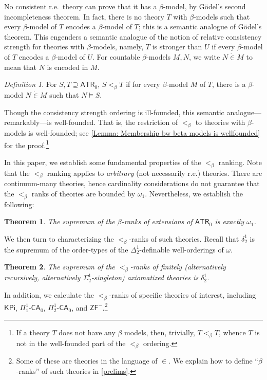 \documentclass{amsart}
\newtheorem{theorem}{Theorem}[section]
\theoremstyle{remark}
\newtheorem{definition}[definition]{Definition}
\begin{document}
No consistent r.e.\ theory can prove that it has a $\beta$-model, by G\"odel's second incompleteness theorem. In fact, there is no theory $T$ with $\beta$-models such that every $\beta$-model of $T$ encodes a $\beta$-model of $T$; this is a semantic analogue of G\"odel's theorem. This engenders a semantic analogue of the notion of relative consistency strength for theories with $\beta$-models, namely, $T$ is stronger than $U$ if every $\beta$-model of $T$ encodes a $\beta$-model of $U$. For countable $\beta$-models $M,N$, we write $N\dot\in M$ to mean that $N$ is encoded in $M$.

\begin{definition}
    For $S,T\supseteq \mathsf{ATR}_0$, $S<_\beta T$ if for every $\beta$-model $M$ of $T$, there is a $\beta$-model $N\dot\in M$ such that $N\vDash S$.
\end{definition}

Though the consistency strength ordering is ill-founded, this semantic analogue---remarkably---is well-founded. That is, the restriction of $<_\beta$ to theories with $\beta$-models is well-founded; see \autoref{Lemma: Membership bw beta models is wellfounded} for the proof.\footnote{If a theory $T$ does not have any $\beta$ models, then, trivially, $T<_\beta T$, whence $T$ is not in the well-founded part of the $<_\beta$ ordering.}

In this paper, we establish some fundamental properties of the $<_\beta$ ranking. Note that the $<_\beta$ ranking applies to \emph{arbitrary} (not necessarily r.e.) theories. There are continuum-many theories, hence cardinality considerations do not guarantee that the $<_\beta$ ranks of theories are bounded by $\omega_1$. Nevertheless, we establish the following:
\begin{theorem}
    The supremum of the $\beta$-ranks of extensions of $\mathsf{ATR}_0$ is exactly $\omega_1$.
\end{theorem}

We then turn to characterizing the $<_\beta$-ranks of such theories. Recall that $\delta^1_2$ is the supremum of the order-types of the $\Delta^1_2$-definable well-orderings of $\omega$.
\begin{theorem}
    The supremum of the $<_\beta$-ranks of finitely (alternatively recursively, alternatively $\Sigma^1_2$-singleton) axiomatized theories is $\delta^1_2$. 
\end{theorem}
In addition, we calculate the $<_\beta$-ranks of specific theories of interest, including $\mathsf{KPi}$, $\Pi^1_1\text{-}\mathsf{CA}_0$, $\Pi^1_2\text{-}\mathsf{CA}_0$, and $\mathsf{ZF}^-$.\footnote{Some of these are theories in the language of $\in$. We explain how to define ``$\beta$-ranks'' of such theories in \textsection \ref{prelims}.}
\end{document}
